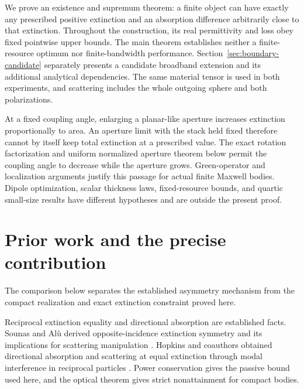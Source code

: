 \documentclass[11pt]{article}
\begin{document}
We prove an existence and supremum theorem: a finite object can have exactly any prescribed positive extinction and an absorption difference arbitrarily close to that extinction. Throughout the construction, its real permittivity and loss obey fixed pointwise upper bounds. The main theorem establishes neither a finite-resource optimum nor finite-bandwidth performance. Section~\ref{sec:boundary-candidate} separately presents a candidate broadband extension and its additional analytical dependencies. The same material tensor is used in both experiments, and scattering includes the whole outgoing sphere and both polarizations.

At a fixed coupling angle, enlarging a planar-like aperture increases extinction proportionally to area. An aperture limit with the stack held fixed therefore cannot by itself keep total extinction at a prescribed value. The exact rotation factorization and uniform normalized aperture theorem below permit the coupling angle to decrease while the aperture grows. Green-operator and localization arguments justify this passage for actual finite Maxwell bodies. Dipole optimization, scalar thickness laws, fixed-resource bounds, and quartic small-size results have different hypotheses and are outside the present proof.

\section{Prior work and the precise contribution}\label{sec:prior}
The comparison below separates the established asymmetry mechanism from the compact realization and exact extinction constraint proved here.

Reciprocal extinction equality and directional absorption are established facts. Sounas and Al\`u derived opposite-incidence extinction symmetry and its implications for scattering manipulation \citep{SounasAlu2014}. Hopkins and coauthors obtained directional absorption and scattering at equal extinction through modal interference in reciprocal particles \citep{Hopkins2015}. Power conservation gives the passive bound used here, and the optical theorem gives strict nonattainment for compact bodies.
\end{document}
